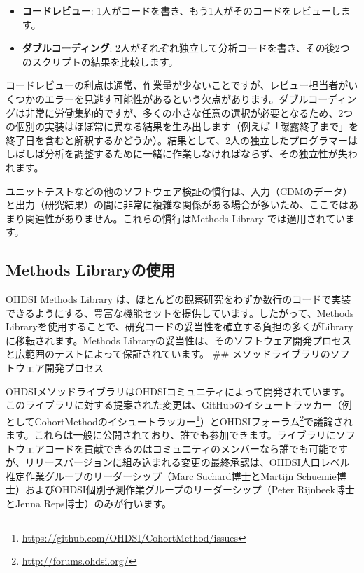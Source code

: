 \documentclass[
  11pt]{book}
\providecommand{\tightlist}{%
  \setlength{\itemsep}{0pt}\setlength{\parskip}{0pt}}
\theoremstyle{definition}
\theoremstyle{definition}
\theoremstyle{definition}
\theoremstyle{definition}
\theoremstyle{remark}
\begin{document}
\begin{itemize}
\tightlist
\item
  \textbf{コードレビュー}: 1人がコードを書き、もう1人がそのコードをレビューします。
\item
  \textbf{ダブルコーディング}: 2人がそれぞれ独立して分析コードを書き、その後2つのスクリプトの結果を比較します。
\end{itemize}

コードレビューの利点は通常、作業量が少ないことですが、レビュー担当者がいくつかのエラーを見逃す可能性があるという欠点があります。ダブルコーディングは非常に労働集約的ですが、多くの小さな任意の選択が必要となるため、2つの個別の実装はほぼ常に異なる結果を生み出します（例えば「曝露終了まで」を終了日を含むと解釈するかどうか）。結果として、2人の独立したプログラマーはしばしば分析を調整するために一緒に作業しなければならず、その独立性が失われます。

ユニットテストなどの他のソフトウェア検証の慣行は、入力（CDMのデータ）と出力（研究結果）の間に非常に複雑な関係がある場合が多いため、ここではあまり関連性がありません。これらの慣行はMethods Library では適用されています。

\subsection{Methods Libraryの使用}\label{methods-libraryux306eux4f7fux7528}

\href{https://ohdsi.github.io/MethodsLibrary/}{OHDSI Methods Library} は、ほとんどの観察研究をわずか数行のコードで実装できるようにする、豊富な機能セットを提供しています。したがって、Methods Libraryを使用することで、研究コードの妥当性を確立する負担の多くがLibraryに移転されます。Methods Libraryの妥当性は、そのソフトウェア開発プロセスと広範囲のテストによって保証されています。
\#\# メソッドライブラリのソフトウェア開発プロセス

OHDSIメソッドライブラリはOHDSIコミュニティによって開発されています。このライブラリに対する提案された変更は、GitHubのイシュートラッカー（例としてCohortMethodのイシュートラッカー\footnote{\url{https://github.com/OHDSI/CohortMethod/issues}}）とOHDSIフォーラム\footnote{\url{http://forums.ohdsi.org/}}で議論されます。これらは一般に公開されており、誰でも参加できます。ライブラリにソフトウェアコードを貢献できるのはコミュニティのメンバーなら誰でも可能ですが、リリースバージョンに組み込まれる変更の最終承認は、OHDSI人口レベル推定作業グループのリーダーシップ（Marc Suchard博士とMartijn Schuemie博士）およびOHDSI個別予測作業グループのリーダーシップ（Peter Rijnbeek博士とJenna Reps博士）のみが行います。
\end{document}
